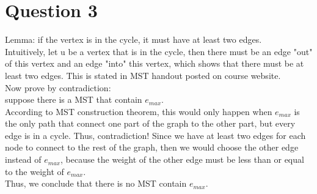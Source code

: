 \documentclass[10pt]{article}
\begin{document}
\section*{Question 3}
Lemma: if the vertex is in the cycle, it must have at least two edges.\\
Intuitively, let u be a vertex that is in the cycle, then there must be an edge "out" of this vertex and an edge "into" this vertex, which shows that there must be at least two edges. This is stated in MST handout posted on course website.\\
Now prove by contradiction:\\
suppose there is a MST that contain $e_{max}$.\\
According to MST construction theorem, this would only happen when $e_{max}$ is the only path that connect one part of the graph to the other part, but every edge is in a cycle. Thus, contradiction! Since we have at least two edges for each node to connect to the rest of the graph, then we would choose the other edge instead of $e_{max}$, because the weight of the other edge must be less than or equal to the weight of $e_{max}$.\\
Thus, we conclude that there is no MST contain $e_{max}$.
\end{document}

